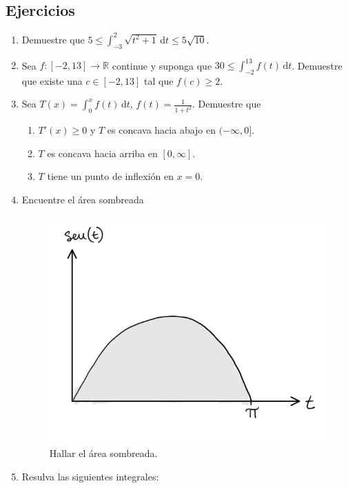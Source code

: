 \documentclass{article}
\numberwithin{equation}{section}
\newcommand{\col}[1]{\textcolor{ProcessBlue}{#1}}
\newcommand{\integrate}[4]{\int_{#1}^{#2} \! {#3} \, \mathrm{d} {#4}}
\begin{document}
\subsection{\col{Ejercicios}}

\begin{enumerate}
    \item Demuestre que $5\leq \integrate{-3}{2}{\sqrt{t^2+1}}{t}\leq 5\sqrt{10}$.
    \item Sea $f:[-2,13]\to\mathbb{R}$ continue y suponga que $30 \leq \integrate{-2}{13}{f(t)}{t}$. Demuestre que existe una $c\in[-2,13]$ tal que $f(c)\geq 2$.
    \item Sea $T(x)=\integrate{0}{x}{f(t)}{t}$, $f(t)=\frac{1}{1+t^2}$. Demuestre que
        \begin{enumerate}
            \item $T'(x)\geq 0$ y $T$ es concava hacia abajo en $(-\infty,0]$.
            \item $T$ es concava hacia arriba en $[0,\infty]$.
            \item $T$ tiene un punto de inflexión en $x=0$.
        \end{enumerate}
    \item Encuentre el área sombreada
        \begin{figure}[H]
            \centering
            \includegraphics[scale=0.4]{images/fig10.png}
            \caption{Hallar el área sombreada.}
            \label{fig:fig10}
        \end{figure}  
    \item Resulva las siguientes integrales:

\end{enumerate}
\end{document}
